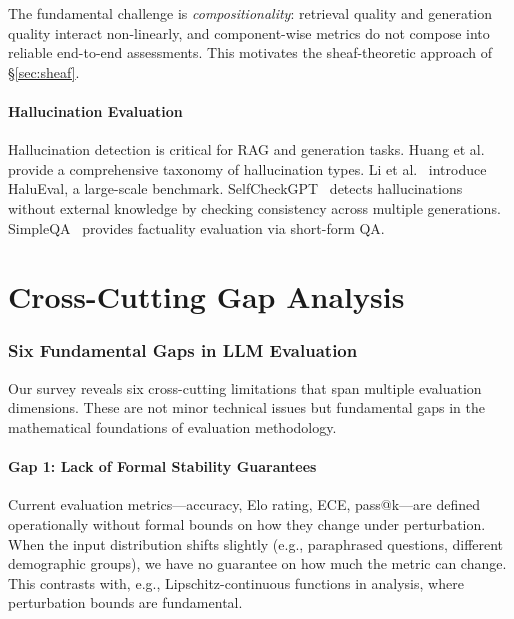 \documentclass[11pt]{article}
\begin{document}
The fundamental challenge is \emph{compositionality}: retrieval quality and generation quality interact non-linearly, and component-wise metrics do not compose into reliable end-to-end assessments. This motivates the sheaf-theoretic approach of \S\ref{sec:sheaf}.

\subsection{Hallucination Evaluation}

Hallucination detection is critical for RAG and generation tasks. Huang et al.~\cite{huang2023hallucination} provide a comprehensive taxonomy of hallucination types. Li et al.~\cite{li2023halueval} introduce HaluEval, a large-scale benchmark. SelfCheckGPT~\cite{manakul2023selfcheckgpt} detects hallucinations without external knowledge by checking consistency across multiple generations. SimpleQA~\cite{openai2024simpleqa} provides factuality evaluation via short-form QA.



\part{Cross-Cutting Gap Analysis}
\label{part:gaps}

\section{Six Fundamental Gaps in LLM Evaluation}
\label{sec:gaps}

Our survey reveals six cross-cutting limitations that span multiple evaluation dimensions. These are not minor technical issues but fundamental gaps in the mathematical foundations of evaluation methodology.

\subsection{Gap 1: Lack of Formal Stability Guarantees}

Current evaluation metrics---accuracy, Elo rating, ECE, pass@k---are defined operationally without formal bounds on how they change under perturbation. When the input distribution shifts slightly (e.g., paraphrased questions, different demographic groups), we have no guarantee on how much the metric can change. This contrasts with, e.g., Lipschitz-continuous functions in analysis, where perturbation bounds are fundamental.
\end{document}
